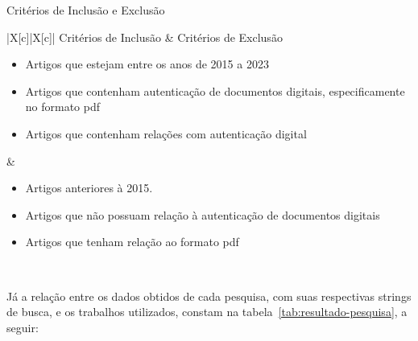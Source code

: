 \begin{table}[h!]
    \caption[Critérios de Inclusão e Exclusão]{Critérios de Inclusão e Exclusão}
    \begin{tblr}{|X[c]|X[c]|}
        \hline
        Critérios de Inclusão & Critérios de Exclusão \\ \hline
        \begin{itemize}[leftmargin=10px]
            \item Artigos que estejam entre os anos de 2015 a 2023
            \item Artigos que contenham autenticação de documentos digitais,
            especificamente no formato \acrshort{pdf}
            \item Artigos que contenham relações com autenticação digital
        \end{itemize} &
        \begin{itemize}[leftmargin=10px]
            \item Artigos anteriores à 2015.
            \item Artigos que não possuam relação à autenticação de
            documentos digitais
            \item Artigos que tenham relação ao formato \acrshort{pdf}
        \end{itemize} \\ \hline
    \end{tblr}
    \sourcesearchfootnote
    \label{tab:criterios-exclusao}
\end{table}
\clearpage

Já a relação entre os dados obtidos de cada pesquisa, com suas
respectivas strings de busca, e os trabalhos utilizados, constam na
tabela~\ref{tab:resultado-pesquisa}, a seguir:

